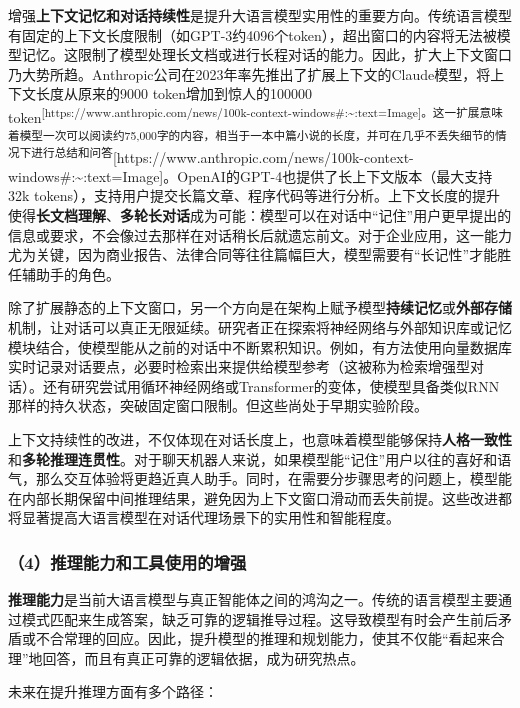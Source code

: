 \documentclass[
  letterpaper,
]{scrbook}
\begin{document}
增强\textbf{上下文记忆和对话持续性}是提升大语言模型实用性的重要方向。传统语言模型有固定的上下文长度限制（如GPT-3约4096个token），超出窗口的内容将无法被模型记忆。这限制了模型处理长文档或进行长程对话的能力。因此，扩大上下文窗口乃大势所趋。Anthropic公司在2023年率先推出了扩展上下文的Claude模型，将上下文长度从原来的9000
token增加到惊人的100000
token\textsuperscript{{[}https://www.anthropic.com/news/100k-context-windows\#:\textasciitilde:text=Image{]}。这一扩展意味着模型一次可以阅读约75,000字的内容，相当于一本中篇小说的长度，并可在几乎不丢失细节的情况下进行总结和问答}{[}https://www.anthropic.com/news/100k-context-windows\#:\textasciitilde:text=Image{]}。OpenAI的GPT-4也提供了长上下文版本（最大支持32k
tokens），支持用户提交长篇文章、程序代码等进行分析。上下文长度的提升使得\textbf{长文档理解}、\textbf{多轮长对话}成为可能：模型可以在对话中``记住''用户更早提出的信息或要求，不会像过去那样在对话稍长后就遗忘前文。对于企业应用，这一能力尤为关键，因为商业报告、法律合同等往往篇幅巨大，模型需要有``长记性''才能胜任辅助手的角色。

除了扩展静态的上下文窗口，另一个方向是在架构上赋予模型\textbf{持续记忆}或\textbf{外部存储}机制，让对话可以真正无限延续。研究者正在探索将神经网络与外部知识库或记忆模块结合，使模型能从之前的对话中不断累积知识。例如，有方法使用向量数据库实时记录对话要点，必要时检索出来提供给模型参考（这被称为检索增强型对话）。还有研究尝试用循环神经网络或Transformer的变体，使模型具备类似RNN那样的持久状态，突破固定窗口限制。但这些尚处于早期实验阶段。

上下文持续性的改进，不仅体现在对话长度上，也意味着模型能够保持\textbf{人格一致性}和\textbf{多轮推理连贯性}。对于聊天机器人来说，如果模型能``记住''用户以往的喜好和语气，那么交互体验将更趋近真人助手。同时，在需要分步骤思考的问题上，模型能在内部长期保留中间推理结果，避免因为上下文窗口滑动而丢失前提。这些改进都将显著提高大语言模型在对话代理场景下的实用性和智能程度。

\subsubsection{（4）推理能力和工具使用的增强}\label{ux63a8ux7406ux80fdux529bux548cux5de5ux5177ux4f7fux7528ux7684ux589eux5f3a}

\textbf{推理能力}是当前大语言模型与真正智能体之间的鸿沟之一。传统的语言模型主要通过模式匹配来生成答案，缺乏可靠的逻辑推导过程。这导致模型有时会产生前后矛盾或不合常理的回应。因此，提升模型的推理和规划能力，使其不仅能``看起来合理''地回答，而且有真正可靠的逻辑依据，成为研究热点。

未来在提升推理方面有多个路径：
\end{document}
